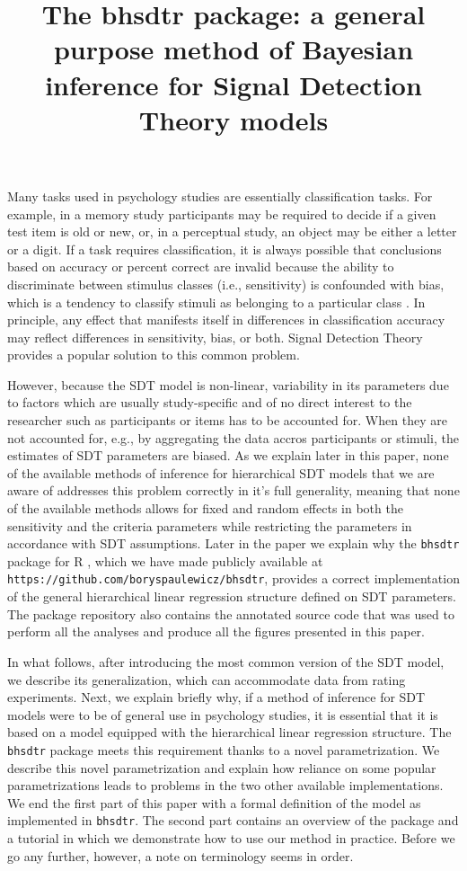 \documentclass[a4paper,man,apacite,floatsintext]{apa6}
\title{The bhsdtr package: a general purpose method of Bayesian
  inference for Signal Detection Theory models}
\newcommand{\code}[1]{\texttt{#1}}
\begin{document}
\maketitle Many tasks used in psychology studies are essentially
classification tasks. For example, in a memory study participants may
be required to decide if a given test item is old or new, or, in a
perceptual study, an object may be either a letter or a digit. If a
task requires classification, it is always possible that conclusions
based on accuracy or percent correct are invalid because the ability
to discriminate between stimulus classes (i.e., sensitivity) is
confounded with bias, which is a tendency to classify stimuli as
belonging to a particular class \cite{GreenSwets66}. In principle, any
effect that manifests itself in differences in classification accuracy
may reflect differences in sensitivity, bias, or both. Signal
Detection Theory provides a popular solution to this common problem.

However, because the SDT model is non-linear, variability in its
parameters due to factors which are usually study-specific and of no
direct interest to the researcher such as participants or items has to
be accounted for. When they are not accounted for, e.g., by
aggregating the data accros participants or stimuli, the estimates of
SDT parameters are biased. As we explain later in this paper, none of
the available methods of inference for hierarchical SDT models that we
are aware of addresses this problem correctly in it's full generality,
meaning that none of the available methods allows for fixed and random
effects in both the sensitivity and the criteria parameters while
restricting the parameters in accordance with SDT assumptions. Later
in the paper we explain why the \code{bhsdtr} package for R
\cite{rstatistical}, which we have made publicly available at
\code{https://github.com/boryspaulewicz/bhsdtr}, provides a correct
implementation of the general hierarchical linear regression structure
defined on SDT parameters. The package repository also contains the
annotated source code that was used to perform all the analyses and
produce all the figures presented in this paper.

In what follows, after introducing the most common version of the SDT
model, we describe its generalization, which can accommodate data from
rating experiments. Next, we explain briefly why, if a method of
inference for SDT models were to be of general use in psychology
studies, it is essential that it is based on a model equipped with the
hierarchical linear regression structure. The \code{bhsdtr} package
meets this requirement thanks to a novel parametrization. We describe
this novel parametrization and explain how reliance on some popular
parametrizations leads to problems in the two other available
implementations. We end the first part of this paper with a formal
definition of the model as implemented in \code{bhsdtr}. The second
part contains an overview of the package and a tutorial in which we
demonstrate how to use our method in practice. Before we go any
further, however, a note on terminology seems in order.
\end{document}
